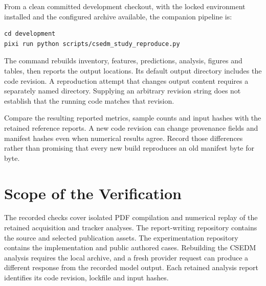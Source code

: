 From a clean committed development checkout, with the locked environment installed and the configured archive available,
the companion pipeline is:

\begin{verbatim}
cd development
pixi run python scripts/csedm_study_reproduce.py
\end{verbatim}

The command rebuilds inventory, features, predictions, analysis, figures and tables, then reports the output locations. Its
default output directory includes the code revision. A reproduction attempt that changes output content requires a separately
named directory. Supplying an arbitrary revision string does not establish that the running code matches that revision.

Compare the resulting reported metrics, sample counts and input hashes with the retained reference reports. A new code
revision can change provenance fields and manifest hashes even when numerical results agree. Record those differences rather
than promising that every new build reproduces an old manifest byte for byte.

\section{Scope of the Verification}

The recorded checks cover isolated PDF compilation and numerical replay of the retained acquisition and tracker analyses.
The report-writing repository contains the source and selected publication assets. The experimentation repository contains
the implementation and public authored cases. Rebuilding the CSEDM analysis requires the local archive, and a fresh provider
request can produce a different response from the recorded model output. Each retained analysis report identifies its code
revision, lockfile and input hashes.
